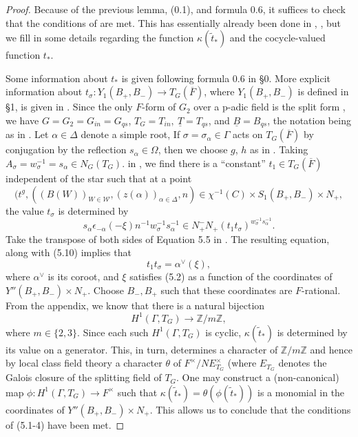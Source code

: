 \documentclass[12pt,letterpaper]{amsart}
\newcommand{\zzz}{\mathbb{Z}}
\begin{document}
\begin{proof} Because of the previous lemma, (0.1), and formula 0.6,
it suffices to check that the conditions of \cite{LS83} are met. This
has essentially already been done in \cite{La83},
\cite[ch I, proof of Prop. 5.2]{Ha92a},
but we fill in some details regarding the function $\kappa(\tilde{t}_*)$
and the cocycle-valued function $t_*$.

Some information about $t_*$ is given following formula 0.6 in \S 0.
More explicit information about
$t_\sigma :Y_1(B_+,B_-)\rightarrow T_G(\overline{F})$, where
$Y_1(B_+,B_-)$ is defined in \S 1, is given in
\cite[ch I, Corollary 5.4]{Ha92a}. Since the
only $F$-form of $G_2$ over a p-adic field is the split form \cite{Ti65},
we have $G=G_2=G_{in}=G_{qs}$, $T_G=T_{in}, \ \underline{T}=T_{qs}$, and
$\underline{B}=B_{qs}$, the notation being as in \cite{Ha92a}. Let
$\alpha\in \Delta$ denote a simple root,
If $\sigma=\sigma_\alpha\in \Gamma$ acts on
$T_G(\overline{F})$ by conjugation by the
reflection $s_\alpha\in \Omega$, then
we choose $g$, $h$ as in
\cite[ch I, \S 5]{Ha92a}. Taking
$A_\sigma=w_\sigma^{-1}=s_\alpha \in N_G(T_G)$.
in \cite[ch I, Corollary 5.7]{Ha92a}, we find there is a ``constant''
$t_1\in T_G(\overline{F})$ independent of the star such that at a point
\[
(t^g,((B(W))_{W\in{\mathcal W}},(z(\alpha))_{\alpha\in\Delta},n)
\in\chi^{-1}(C)\times S_1(B_+,B_-)\times N_+,
\]
the value $t_\sigma$ is determined by
\[
s_\alpha \epsilon_{-\alpha}(-\xi)n^{-1}w_\sigma^{-1}s_\alpha^{-1}\in
N_+^- N_+ (t_1t_\sigma)^{w_\sigma^{-1}s_\alpha^{-1}}.
\tag{5.18}
\]
Take the transpose of both sides of Equation 5.5 in
\cite[ch I]{Ha92a}. The resulting equation,
along with (5.10) implies that
\[
t_1t_\sigma = \alpha^\vee(\xi),
\]
where $\alpha^{\vee}$ is its coroot, and $\xi$ satisfies (5.2)
as a function of the coordinates of $Y''(B_+,B_-)\times N_+$. Choose
$B_-, B_+$ such that these coordinates are $F$-rational.
From the appendix, we know that there is a natural bijection
\[
H^1(\Gamma,T_G)\rightarrow \zzz/ m\zzz,
\]
where $m\in \{2,3\}$. Since each such $H^1(\Gamma,T_G)$ is cyclic,
$\kappa(\tilde{t}_*)$ is determined by its value on a generator. This,
in turn, determines a character of $\zzz/m\zzz$ and
hence by local class field theory a
character $\theta$ of $F^\times/NE_{T_G}^\times$ (where $E_{T_G}$
denotes the Galois closure of the splitting field of $T_G$. One may
construct a (non-canonical) map
$\phi:H^1(\Gamma,T_G) \rightarrow F^\times$
such that $\kappa(\tilde{t}_*)=\theta(\phi(\tilde{t}_*))$
is a monomial in the coordinates of $Y''(B_+,B_-)\times N_+$.
This allows us to conclude that the
conditions of (5.1-4) have been met.
\end{proof}
\end{document}
